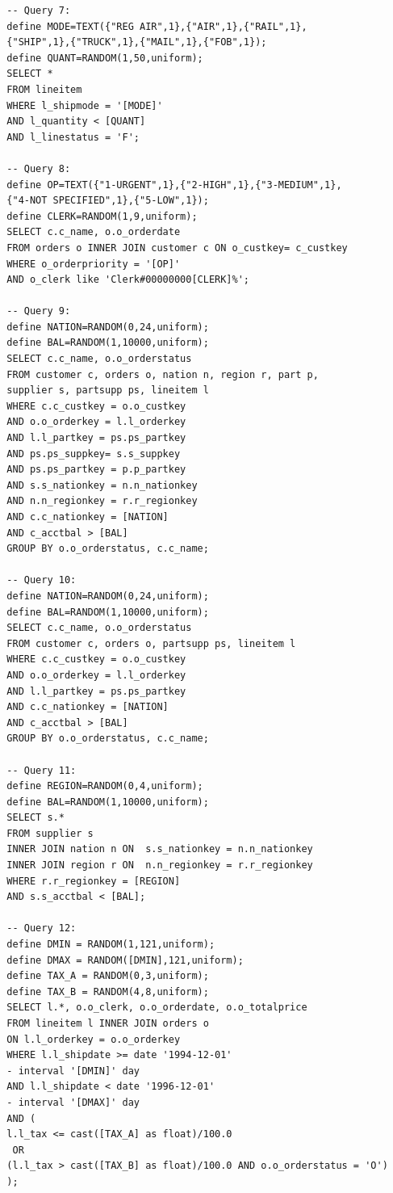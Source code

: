 \begin{toappendix}
\begin{verbatim}
  -- Query 7:
  define MODE=TEXT({"REG AIR",1},{"AIR",1},{"RAIL",1},
  {"SHIP",1},{"TRUCK",1},{"MAIL",1},{"FOB",1});
  define QUANT=RANDOM(1,50,uniform);
  SELECT *
  FROM lineitem
  WHERE l_shipmode = '[MODE]'
  AND l_quantity < [QUANT]
  AND l_linestatus = 'F';

  -- Query 8:
  define OP=TEXT({"1-URGENT",1},{"2-HIGH",1},{"3-MEDIUM",1},
  {"4-NOT SPECIFIED",1},{"5-LOW",1});
  define CLERK=RANDOM(1,9,uniform);
  SELECT c.c_name, o.o_orderdate
  FROM orders o INNER JOIN customer c ON o_custkey= c_custkey
  WHERE o_orderpriority = '[OP]'
  AND o_clerk like 'Clerk#00000000[CLERK]%';

  -- Query 9:
  define NATION=RANDOM(0,24,uniform);
  define BAL=RANDOM(1,10000,uniform);
  SELECT c.c_name, o.o_orderstatus
  FROM customer c, orders o, nation n, region r, part p,
  supplier s, partsupp ps, lineitem l
  WHERE c.c_custkey = o.o_custkey
  AND o.o_orderkey = l.l_orderkey
  AND l.l_partkey = ps.ps_partkey
  AND ps.ps_suppkey= s.s_suppkey
  AND ps.ps_partkey = p.p_partkey
  AND s.s_nationkey = n.n_nationkey
  AND n.n_regionkey = r.r_regionkey
  AND c.c_nationkey = [NATION]
  AND c_acctbal > [BAL]
  GROUP BY o.o_orderstatus, c.c_name;

  -- Query 10:
  define NATION=RANDOM(0,24,uniform);
  define BAL=RANDOM(1,10000,uniform);
  SELECT c.c_name, o.o_orderstatus
  FROM customer c, orders o, partsupp ps, lineitem l
  WHERE c.c_custkey = o.o_custkey
  AND o.o_orderkey = l.l_orderkey
  AND l.l_partkey = ps.ps_partkey
  AND c.c_nationkey = [NATION]
  AND c_acctbal > [BAL]
  GROUP BY o.o_orderstatus, c.c_name;

  -- Query 11:
  define REGION=RANDOM(0,4,uniform);
  define BAL=RANDOM(1,10000,uniform);
  SELECT s.*
  FROM supplier s
  INNER JOIN nation n ON  s.s_nationkey = n.n_nationkey
  INNER JOIN region r ON  n.n_regionkey = r.r_regionkey
  WHERE r.r_regionkey = [REGION]
  AND s.s_acctbal < [BAL];

  -- Query 12:
  define DMIN = RANDOM(1,121,uniform);
  define DMAX = RANDOM([DMIN],121,uniform);
  define TAX_A = RANDOM(0,3,uniform);
  define TAX_B = RANDOM(4,8,uniform);
  SELECT l.*, o.o_clerk, o.o_orderdate, o.o_totalprice
  FROM lineitem l INNER JOIN orders o
  ON l.l_orderkey = o.o_orderkey
  WHERE l.l_shipdate >= date '1994-12-01'
  - interval '[DMIN]' day
  AND l.l_shipdate < date '1996-12-01'
  - interval '[DMAX]' day
  AND (
  l.l_tax <= cast([TAX_A] as float)/100.0
   OR
  (l.l_tax > cast([TAX_B] as float)/100.0 AND o.o_orderstatus = 'O')
  );


\end{verbatim}
\end{toappendix}
